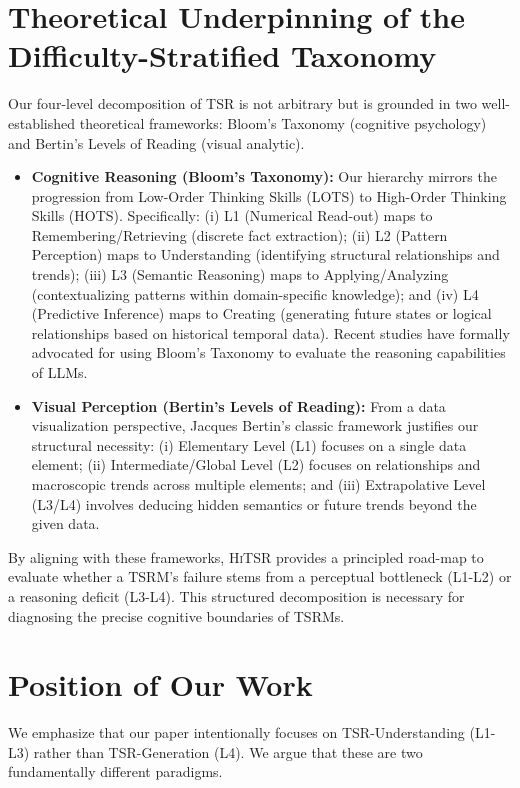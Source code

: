 \documentclass[11pt]{article}
\begin{document}
\section{Theoretical Underpinning of the Difficulty-Stratified Taxonomy}
Our four-level decomposition of TSR is not arbitrary but is grounded in two well-established theoretical frameworks: Bloom's Taxonomy \cite{bloom} (cognitive psychology) and Bertin's Levels of Reading \cite{Bertin} (visual analytic).
\begin{itemize}[left=0pt]
    \item \textbf{Cognitive Reasoning (Bloom's Taxonomy):} Our hierarchy mirrors the progression from Low-Order Thinking Skills (LOTS) to High-Order Thinking Skills (HOTS). Specifically: (i) L1 (Numerical Read-out) maps to Remembering/Retrieving (discrete fact extraction); (ii) L2 (Pattern Perception) maps to Understanding (identifying structural relationships and trends); (iii) L3 (Semantic Reasoning) maps to Applying/Analyzing (contextualizing patterns within domain-specific knowledge); and (iv) L4 (Predictive Inference) maps to Creating (generating future states or logical relationships based on historical temporal data). Recent studies \cite{huber2025llms} have formally advocated for using Bloom's Taxonomy to evaluate the reasoning capabilities of LLMs.
    \item \textbf{Visual Perception (Bertin’s Levels of Reading):} From a data visualization perspective, Jacques Bertin’s classic framework justifies our structural necessity: (i) Elementary Level (L1) focuses on a single data element; (ii) Intermediate/Global Level (L2) focuses on relationships and macroscopic trends across multiple elements; and (iii) Extrapolative Level (L3/L4) involves deducing hidden semantics or future trends beyond the given data.
\end{itemize}
By aligning with these frameworks, \textsc{HiTSR} provides a principled road-map to evaluate whether a TSRM's failure stems from a perceptual bottleneck (L1-L2) or a reasoning deficit (L3-L4). This structured decomposition is necessary for diagnosing the precise cognitive boundaries of TSRMs.

\section{Position of Our Work}

We emphasize that our paper intentionally focuses on TSR-Understanding (L1-L3) rather than TSR-Generation (L4). We argue that these are two fundamentally different paradigms.
\end{document}
